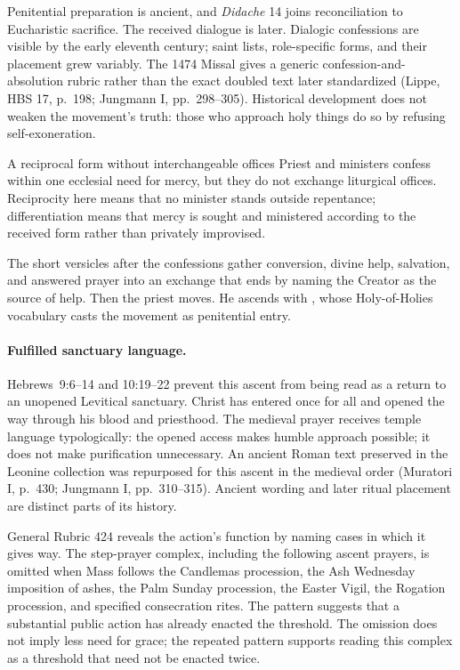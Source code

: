 Penitential preparation is ancient, and \emph{Didache} 14 joins reconciliation to Eucharistic sacrifice. The received dialogue is later. Dialogic confessions are visible by the early eleventh century; saint lists, role-specific forms, and their placement grew variably. The 1474 Missal gives a generic confession-and-absolution rubric rather than the exact doubled text later standardized (Lippe, HBS 17, p.~198; Jungmann I, pp.~298--305). Historical development does not weaken the movement's truth: those who approach holy things do so by refusing self-exoneration.

\begin{studybox}{A reciprocal form without interchangeable offices}
Priest and ministers confess within one ecclesial need for mercy, but they do not exchange liturgical offices. Reciprocity here means that no minister stands outside repentance; differentiation means that mercy is sought and ministered according to the received form rather than privately improvised.
\end{studybox}


The short versicles after the confessions gather conversion, divine help, salvation, and answered prayer into an exchange that ends by naming the Creator as the source of help. Then the priest moves. He ascends with , whose Holy-of-Holies vocabulary casts the movement as penitential entry.

\paragraph{Fulfilled sanctuary language.}
Hebrews~9:6--14 and 10:19--22 prevent this ascent from being read as a return to an unopened Levitical sanctuary. Christ has entered once for all and opened the way through his blood and priesthood. The medieval prayer receives temple language typologically: the opened access makes humble approach possible; it does not make purification unnecessary. An ancient Roman text preserved in the Leonine collection was repurposed for this ascent in the medieval order (Muratori I, p.~430; Jungmann I, pp.~310--315). Ancient wording and later ritual placement are distinct parts of its history.

General Rubric 424 reveals the action's function by naming cases in which it gives way. The step-prayer complex, including the following ascent prayers, is omitted when Mass follows the Candlemas procession, the Ash Wednesday imposition of ashes, the Palm Sunday procession, the Easter Vigil, the Rogation procession, and specified consecration rites. The pattern suggests that a substantial public action has already enacted the threshold. The omission does not imply less need for grace; the repeated pattern supports reading this complex as a threshold that need not be enacted twice.

